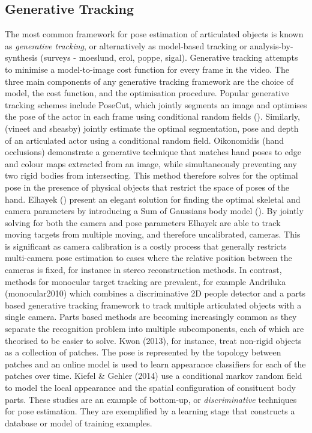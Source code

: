 \subsection{Generative Tracking}

The most common framework for pose estimation of articulated objects is known as \textit{generative tracking}, or alternatively as model-based tracking or analysis-by-synthesis (surveys - moeslund, erol, poppe, sigal). Generative tracking attempts to minimise a model-to-image cost function for every frame in the video. The three main components of any generative tracking framework are the choice of model, the cost function, and the optimisation procedure. Popular generative tracking schemes include PoseCut, which jointly segments an image and optimises the pose of the actor in each frame using conditional random fields (). Similarly, (vineet and sheasby) jointly estimate the optimal segmentation, pose and depth of an articulated actor using a conditional random field. Oikonomidis (hand occlusions) demonstrate a generative technique that matches hand poses to edge and colour maps extracted from an image, while simultaneously preventing any two rigid bodies from intersecting. This method therefore solves for the optimal pose in the presence of physical objects that restrict the space of poses of the hand. Elhayek () present an elegant solution for finding the optimal skeletal and camera parameters by introducing a Sum of Gaussians body model (). By jointly solving for both the camera and pose parameters Elhayek are able to track moving targets from multiple moving, and therefore uncalibrated, cameras. This is significant as camera calibration is a costly process that generally restricts multi-camera pose estimation to cases where the relative position between the cameras is fixed, for instance in stereo reconstruction methods. In contrast, methods for monocular target tracking are prevalent, for example Andriluka (monocular2010) which combines a discriminative 2D people detector and a parts based generative tracking framework to track multiple articulated objects with a single camera. Parts based methods are becoming increasingly common as they separate the recognition problem into multiple subcomponents, each of which are theorised to be easier to solve. Kwon (2013), for instance, treat non-rigid objects as a collection of patches. The pose is represented by the topology between patches and an online model is used to learn appearance classifiers for each of the patches over time. Kiefel \& Gehler (2014) use a conditional markov random field to model the local appearance and the spatial configuration of consituent body parts. These studies are an example of bottom-up, or \textit{discriminative} techniques for pose estimation. They are exemplified by a learning stage that constructs a database or model of training examples. 

